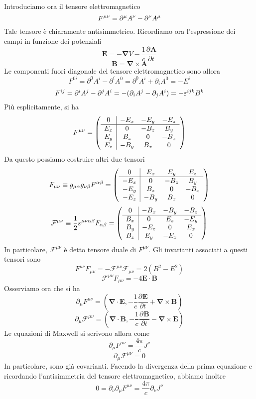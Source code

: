 \documentclass[a4paper,11pt]{book}
\newcommand{\der}[3][]{\frac{\partial ^{#1}#2}{\partial {#3}^{#1}}}
\let\oldnabla\nabla
\renewcommand{\nabla}{\vec{\oldnabla}}
\renewcommand{\vec}[1]{\mathbf{#1}}
\theoremstyle{theorem}
\theoremstyle{definition}
\begin{document}
\noindent Introduciamo ora il tensore elettromagnetico
\[F\indices{^{\mu\nu}}=\partial^\mu A^\nu-\partial^\nu A^\mu\]
Tale tensore è chiaramente antisimmetrico. Ricordiamo ora l'espressione dei campi in funzione dei potenziali
\[\vec{E}=-\nabla V-\frac{1}{c}\der{\vec{A}}{t}\]
\[\vec{B}=\nabla\times\vec{A}\]
Le componenti fuori diagonale del tensore elettromagnetico sono allora
\[F^{0i}=\partial^0A^i-\partial^iA^0=\partial^0A^i+\partial_iA^0=-E^i\]
\[F^{ij}=\partial^iA^j-\partial^jA^i=-(\partial_iA^j-\partial_jA^i)=-\varepsilon\indices{^{ijk}}B^k\]
Più esplicitamente, si ha
\[F^{\mu\nu}=\left(\begin{array}{c|c c c}
0&-E_x&-E_y&-E_z\\\hline E_x&0&-B_z&B_y\\E_y&B_z&0&-B_x\\E_z&-B_y&B_x&0
\end{array}\right)\]
Da questo possiamo costruire altri due tensori
\[F_{\mu\nu}\equiv g_{\mu\alpha}g_{\nu\beta}F^{\alpha\beta}=\left(\begin{array}{c|c c c}
0&E_x&E_y&E_z\\\hline -E_x&0&-B_z&B_y\\-E_y&B_z&0&-B_x\\-E_z&-B_y&B_x&0
\end{array}\right)\]
\[\mathcal{F}^{\mu\nu}\equiv\frac{1}{2}\varepsilon^{\mu\nu\alpha\beta}F_{\alpha\beta}=\left(\begin{array}{c|c c c}
0&-B_x&-B_y&-B_z\\\hline B_x&0&E_z&-E_y\\B_y&-E_z&0&E_x\\B_z&E_y&-E_x&0
\end{array}\right)\]
In particolare, $\mathcal{F}^{\mu\nu}$ è detto tensore duale di $F^{\mu\nu}$. Gli invarianti associati a questi tensori sono
\[F^{\mu\nu}F_{\mu\nu}=-\mathcal{F}^{\mu\nu}\mathcal{F}_{\mu\nu}=2\left(B^2-E^2\right)\]
\[\mathcal{F}^{\mu\nu}F_{\mu\nu}=-4\vec{E}\cdot\vec{B}\]
Osserviamo ora che si ha
\[\partial_\mu F^{\mu\nu}=\left(\nabla\cdot\vec{E},-\frac{1}{c}\der{\vec{E}}{t}+\nabla\times\vec{B}\right)\]
\[\partial_\mu \mathcal{F}^{\mu\nu}=\left(\nabla\cdot\vec{B},-\frac{1}{c}\der{\vec{B}}{t}-\nabla\times\vec{E}\right)\]
Le equazioni di Maxwell si scrivono allora come
\[\partial_\mu F^{\mu\nu}=\frac{4\pi}{c}J^\nu\]
\[\partial_\mu\mathcal{F}^{\mu\nu}=0\]
In particolare, sono già covarianti. Facendo la divergenza della prima equazione e ricordando l'antisimmetria del tensore elettromagnetico, abbiamo inoltre
\[0=\partial_\nu\partial_\mu F^{\mu\nu}=\frac{4\pi}{c}\partial_\nu J^\nu\]
\end{document}
